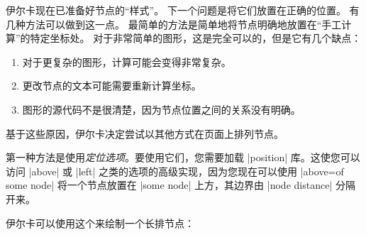 伊尔卡现在已准备好节点的``样式''。 下一个问题是将它们放置在正确的位置。 有几种方法可以做到这一点。 最简单的方法是简单地将节点明确地放置在``手工计算''的特定坐标处。 对于非常简单的图形，这是完全可以的，但是它有几个缺点：

%
\begin{enumerate}
    \item 对于更复杂的图形，计算可能会变得非常复杂。
    \item 更改节点的文本可能需要重新计算坐标。
    \item 图形的源代码不是很清楚，因为节点位置之间的关系没有明确。
\end{enumerate}


基于这些原因，伊尔卡决定尝试以其他方式在页面上排列节点。


第一种方法是使用\emph{定位选项}。要使用它们，您需要加载 |position| 库。这使您可以访问 |above| 或 |left| 之类的选项的高级实现，因为您现在可以使用 |above=of some node| 将一个节点放置在 |some node| 上方，其边界由 |node distance| 分隔开来。


伊尔卡可以使用这个来绘制一个长排节点：

